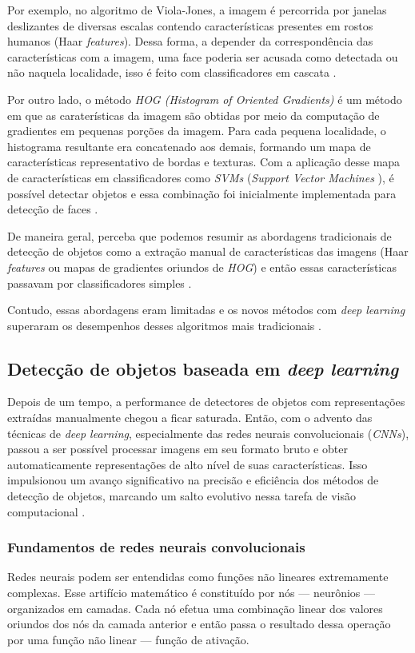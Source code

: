 Por exemplo, no algoritmo de Viola-Jones, a imagem é percorrida por janelas deslizantes de diversas escalas contendo características presentes em rostos humanos (Haar \emph{features}). Dessa forma, a depender da correspondência das características com a imagem, uma face poderia ser acusada como detectada ou não naquela localidade, isso é feito com classificadores em cascata \citep{Viola}.

Por outro lado, o método \emph{HOG (Histogram of Oriented Gradients)} é um método em que as caraterísticas da imagem são obtidas por meio da computação de gradientes em pequenas porções da imagem. Para cada pequena localidade, o histograma resultante era concatenado aos demais, formando um mapa de características representativo de bordas e texturas. Com a aplicação desse mapa de características em classificadores como \emph{SVMs} (\emph{Support Vector Machines} \citep{Cortes1995Support-Vector}), é possível detectar objetos e essa combinação foi inicialmente implementada para detecção de faces \citep{HOG}.

De maneira geral, perceba que podemos resumir as abordagens tradicionais de detecção de objetos como a extração manual de características das imagens (Haar \emph{features} ou mapas de gradientes oriundos de \emph{HOG}) e então essas características passavam por classificadores simples \citep{Viola, HOG}.

Contudo, essas abordagens eram limitadas e os novos métodos com \emph{deep learning} superaram os desempenhos desses algoritmos mais tradicionais \citep{Zou2019Object}.

\subsection{Detecção de objetos baseada em \emph{deep learning}}
Depois de um tempo, a performance de detectores de objetos com representações extraídas manualmente chegou a ficar saturada. Então, com o advento das técnicas de \emph{deep learning}, especialmente das redes neurais convolucionais (\emph{CNNs}), passou a ser possível processar imagens em seu formato bruto e obter automaticamente representações de alto nível de suas características. Isso impulsionou um avanço significativo na precisão e eficiência dos métodos de detecção de objetos, marcando um salto evolutivo nessa tarefa de visão computacional \citep{Zou2019Object}.

\subsubsection{Fundamentos de redes neurais convolucionais}
Redes neurais podem ser entendidas como funções não lineares extremamente complexas. Esse artifício matemático é constituído por nós --- neurônios --- organizados em camadas. Cada nó efetua uma combinação linear dos valores oriundos dos nós da camada anterior e então passa o resultado dessa operação por uma função não linear --- função de ativação. 

